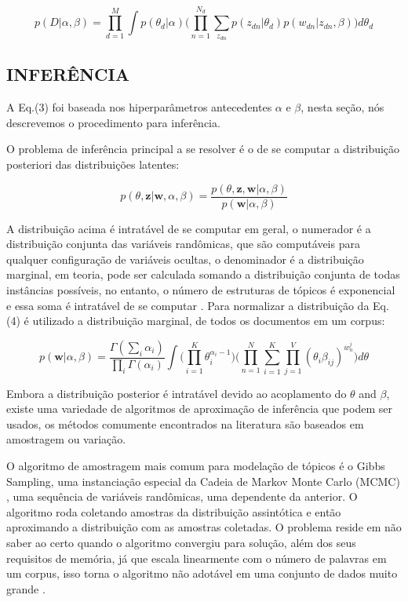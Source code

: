 \documentclass[12pt,a4paper]{article}
\begin{document}
  \begin{equation}
  p(D|\alpha,\beta)= \prod_{d=1}^{M} \int{p(\theta _d|\alpha)\Bigg(\prod_{n=1}^{N_d}\sum_{z_{dn}} p(z_{dn}|\theta _d)p(w_{dn}|z_{dn},\beta)\Bigg)d\theta _d}
  \end{equation}
  
  
  
  \subsection{INFERÊNCIA}
  A Eq.(3) foi baseada nos hiperparâmetros antecedentes $\alpha$ e $\beta$, nesta seção, nós descrevemos o procedimento para inferência.
  
  O problema de inferência principal a se resolver é o de se computar a distribuição posteriori das distribuições latentes:
  
  \begin{equation}
  p(\theta,\textbf{z}|\textbf{w},\alpha,\beta) = \frac{p(\theta,\textbf{z},\textbf{w}|\alpha,\beta)}{p(\textbf{w}|\alpha,\beta)}
  \end{equation}
  
  A distribuição acima é intratável de se computar em geral, o numerador é a distribuição conjunta das variáveis randômicas, que são computáveis para qualquer configuração de variáveis ocultas, o denominador é a distribuição marginal, em teoria, pode ser calculada somando a distribuição conjunta de todas instâncias possíveis, no entanto, o número de estruturas de tópicos é exponencial e essa soma é intratável de se computar \cite{blei2012probabilistic}. Para normalizar a distribuição da Eq.(4) é utilizado a distribuição marginal, de todos os documentos em um corpus:
  
  \begin{equation}
  p(\textbf{w}|\alpha,\beta)=\frac{\Gamma(\sum_{i}\alpha_i)}{\prod_{i}\Gamma(\alpha_i)}\int{\Bigg(\prod_{i=1}^{K}\theta_i^{\alpha_i-1}\Bigg)} \Bigg(\prod_{n=1}^{N}\sum_{i=1}^{K}\prod_{j=1}^{V}(\theta_i\beta_{ij})^{w_n^j}\Bigg)d\theta
  \end{equation}
  
  Embora a distribuição posterior é intratável devido ao acoplamento do $\theta$ and $\beta$, existe uma variedade de algoritmos de aproximação de inferência que podem ser usados, os métodos comumente encontrados na literatura são baseados em amostragem ou variação.
  
  O algoritmo de amostragem mais comum para modelação de tópicos é o Gibbs Sampling, uma instanciação especial da Cadeia de Markov Monte Carlo (MCMC) \cite{jordan1999introduction}, uma sequência de variáveis randômicas, uma dependente da anterior. O algoritmo roda coletando amostras da distribuição assintótica e então aproximando a distribuição com as amostras coletadas. O problema reside em não saber ao certo  quando o algoritmo convergiu para solução, além dos seus requisitos de memória, já que escala linearmente com o número de palavras em um corpus, isso torna o algoritmo não adotável em uma conjunto de dados muito grande \cite{vrehuuvrek2011scalability}.
  
\end{document}
